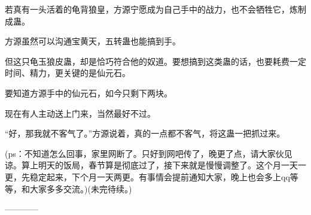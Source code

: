 \begin{this_body}
若真有一头活着的龟背狼皇，方源宁愿成为自己手中的战力，也不会牺牲它，炼制成蛊。

方源虽然可以沟通宝黄天，五转蛊也能搞到手。

但这只龟玉狼皮蛊，却是恰巧符合他的奴道。要想搞到这类蛊的话，也要耗费一定时间、精力，更关键的是仙元石。

要知道方源手中的仙元石，如今只剩下两块。

现在有人主动送上门来，当然最好不过。

“好，那我就不客气了。”方源说着，真的一点都不客气，将这蛊一把抓过来。

(ps：不知道怎么回事，家里网断了。只好到网吧传了，晚更了点，请大家伙见谅。算上明天的饭局，春节算是彻底过了，接下来就是慢慢调整了。这个月一天一更，先稳定起来，下个月一天两更。有事情会提前通知大家，晚上也会多上qq等等，和大家多多交流。)(未完待续。)

------------

\end{this_body}

